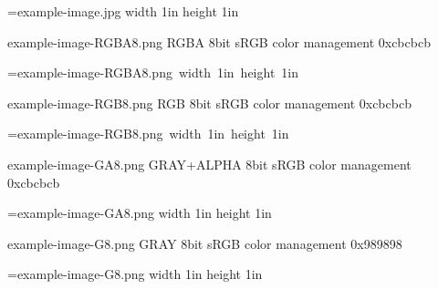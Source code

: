 %
\vbox{\HINTimage=example-image.jpg width 1in height 1in \relax}

example-image-RGBA8.png RGBA 8bit sRGB color management 0xcbcbcb

\hbox{\HINTimage=example-image-RGBA8.png width 1in height 1in \relax}

example-image-RGB8.png RGB 8bit sRGB color management 0xcbcbcb

\hbox{\HINTimage=example-image-RGB8.png width 1in height 1in \relax}

example-image-GA8.png GRAY+ALPHA 8bit sRGB color management 0xcbcbcb

\HINTimage=example-image-GA8.png width 1in height 1in \relax

example-image-G8.png GRAY 8bit sRGB color management 0x989898

\HINTimage=example-image-G8.png width 1in height 1in \relax

\vfill
\bye
